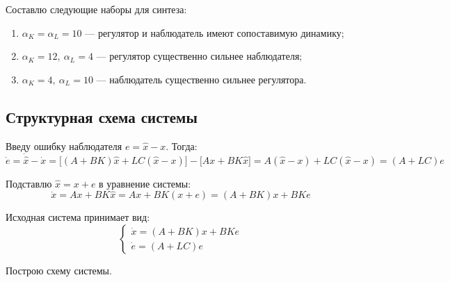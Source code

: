 \documentclass[a4paper,12pt]{article}
\begin{document}
	Составлю следующие наборы для синтеза:
	
	\begin{enumerate}
		\item \(\alpha_K = \alpha_L = 10\) — регулятор и наблюдатель имеют сопоставимую динамику;
		\item \(\alpha_K = 12,\ \alpha_L = 4\) — регулятор существенно сильнее наблюдателя;
		\item \(\alpha_K = 4,\ \alpha_L = 10\) — наблюдатель существенно сильнее регулятора.
	\end{enumerate}
	
	
	\subsection{Структурная схема системы}

	Введу ошибку наблюдателя $e = \hat{x} - x$. Тогда:
	\[
	\dot{e} = \dot{\hat{x}} - \dot{x} 
	= \bigl[(A + BK)\hat{x} + LC(\hat{x} - x)\bigr] - \bigl[Ax + BK\hat{x}\bigr]
	= A(\hat{x} - x) + LC(\hat{x} - x)
	= (A + LC)e
	\]
	
	Подставлю $\hat{x} = x + e$ в уравнение системы:
	\[
	\dot{x} = Ax + BK\hat{x} = Ax + BK(x + e) = (A + BK)x + BKe
	\]
	
	Исходная система принимает вид:
	\[
	\begin{cases}
		\dot{x} = (A + BK)x + BKe \\
		\dot{e} = (A + LC)e
	\end{cases}
	\]

	Построю схему системы. 
	
\end{document}
